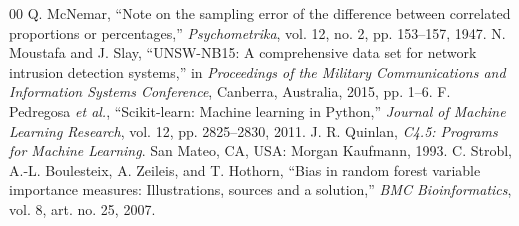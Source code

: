 \documentclass[conference]{IEEEtran}
\begin{document}
\begin{thebibliography}{00}
 Q. McNemar, ``Note on the sampling error of the difference between correlated proportions or percentages,'' \textit{Psychometrika}, vol. 12, no. 2, pp. 153--157, 1947.
 N. Moustafa and J. Slay, ``UNSW-NB15: A comprehensive data set for network intrusion detection systems,'' in \textit{Proceedings of the Military Communications and Information Systems Conference}, Canberra, Australia, 2015, pp. 1--6.
 F. Pedregosa \textit{et al.}, ``Scikit-learn: Machine learning in Python,'' \textit{Journal of Machine Learning Research}, vol. 12, pp. 2825--2830, 2011.
 J. R. Quinlan, \textit{C4.5: Programs for Machine Learning}. San Mateo, CA, USA: Morgan Kaufmann, 1993.
 C. Strobl, A.-L. Boulesteix, A. Zeileis, and T. Hothorn, ``Bias in random forest variable importance measures: Illustrations, sources and a solution,'' \textit{BMC Bioinformatics}, vol. 8, art. no. 25, 2007.
\end{thebibliography}
\end{document}
